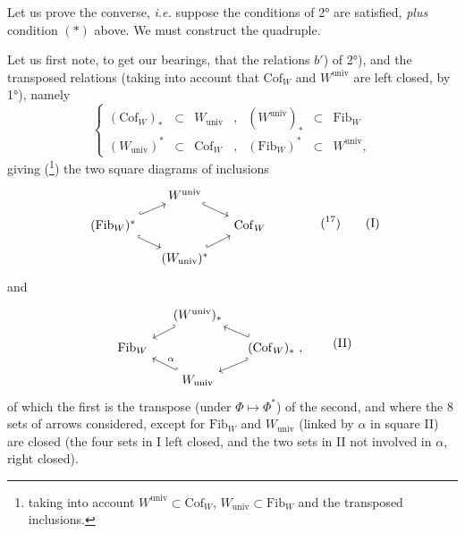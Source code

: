 \documentclass[11pt]{article}
\newcommand{\printedpage}[1]{\marginpar{\footnotesize p.~#1}}
\newcommand{\msp}[1]{\marginpar{\footnotesize [#1]}}
\newcommand{\Cof}{\mathrm{Cof}}
\newcommand{\Fib}{\mathrm{Fib}}
\newcommand{\univ}{\mathrm{univ}}
\begin{document}
Let us prove the converse, \textit{i.e.} suppose the conditions of 2° are satisfied, \textit{plus} condition $(*)$ above. We must construct the quadruple.

\msp{page 22}

Let us first note, to get our bearings, that the relations $b'$) of 2°), and the transposed relations (taking into account that $\Cof_W$ and $W^{\univ}$ are left closed, by 1°), namely
\[ \left\{ \begin{array}{lllllll}
(\Cof_W)_* & \subset & W_{\univ} & , & (W^{\univ})_* & \subset & \Fib_W \\
(W_{\univ})^* & \subset & \Cof_W & , & (\Fib_W)^* & \subset & W^{\univ},
\end{array} \right. \]
giving (\footnote[16]{taking into account $W^{\univ} \subset \Cof_W$, $W_{\univ} \subset \Fib_W$ and the transposed inclusions.}) the two square diagrams of inclusions
\printedpage{13}
\[
\begin{tikzcd}[column sep=small, row sep=small]
 & W^{\univ} \arrow[dr, hook] & \\
(\Fib_W)^* \arrow[ur, hook] \arrow[dr, hook] & & \Cof_W \\
 & (W_{\univ})^* \arrow[ur, hook] &
\end{tikzcd}
\qquad\qquad (\text{\footnotemark[17]})
\tag*{(I)}
\]
and
\[
\begin{tikzcd}[column sep=small, row sep=small]
 & (W^{\univ})_* \arrow[dl, hook'] & \\
\Fib_W & & (\Cof_W)_*\ , \arrow[ul, hook'] \arrow[dl, hook'] \\
 & W_{\univ} \arrow[ul, hook', "\alpha"'] &
\end{tikzcd}
\tag*{(II)}
\]
of which the first is the transpose (under $\Phi \longmapsto \Phi^*$) of the second, and where the 8 sets of arrows considered, except for $\Fib_W$ and $W_{\univ}$ (linked by $\alpha$ in square II) are closed (the four sets in I left closed, and the two sets in II not involved in $\alpha$, right closed).

\msp{page 23}
\end{document}
